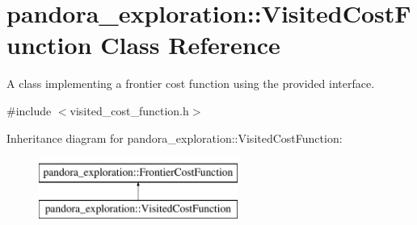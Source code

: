 \hypertarget{classpandora__exploration_1_1_visited_cost_function}{\section{pandora\-\_\-exploration\-:\-:\-Visited\-Cost\-Function \-Class \-Reference}
\label{classpandora__exploration_1_1_visited_cost_function}
}


\-A class implementing a frontier cost function using the provided interface.  




{\ttfamily \#include $<$visited\-\_\-cost\-\_\-function.\-h$>$}

\-Inheritance diagram for pandora\-\_\-exploration\-:\-:\-Visited\-Cost\-Function\-:\begin{figure}[H]
\begin{center}
\leavevmode
\includegraphics[height=2.000000cm]{classpandora__exploration_1_1_visited_cost_function}
\end{center}
\end{figure}
